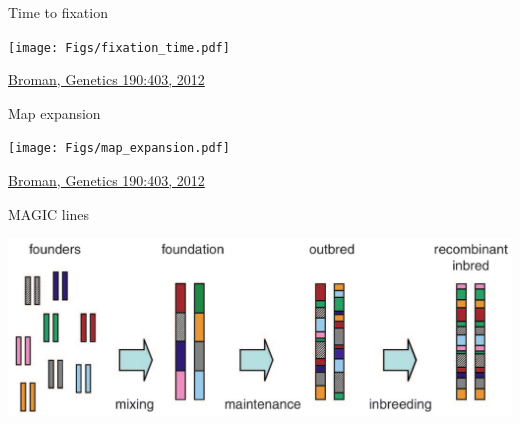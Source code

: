 \documentclass[12pt]{article}
\newcommand{\citesize}{\fontsize{14}{18} \selectfont}
\newcommand{\headsize}{\fontsize{35}{35} \selectfont}
\begin{document}
{\headsize \color{myyellow}
\hfill \begin{minipage}{5.75in}
\centering
Time to fixation
\end{minipage}

\vspace{15mm}

\centerline{\texttt{[image: Figs/fixation\_time.pdf]}}


\vfill

\hfill {\citesize \color{citecolor} \href{http://www.genetics.org/content/190/2/403.full}{Broman, Genetics
190:403, 2012}}

\vspace*{5mm}



\newpage


\headsize \color{myyellow}
\hfill \begin{minipage}{5.75in}
\centering
Map expansion
\end{minipage}

\vspace{12mm}

\centerline{\texttt{[image: Figs/map\_expansion.pdf]}}

\vfill

\hfill {\citesize \color{citecolor} \href{http://www.genetics.org/content/190/2/403.full}{Broman, Genetics
190:403, 2012}}

\vspace*{5mm}



\newpage


\headsize \color{myyellow}
\hfill \begin{minipage}{5.75in}
\centering
MAGIC lines
\end{minipage}

\vspace{20mm}

\centerline{\includegraphics[width=10in]{Figs/valdar_genet2006.png}}

}
\end{document}
